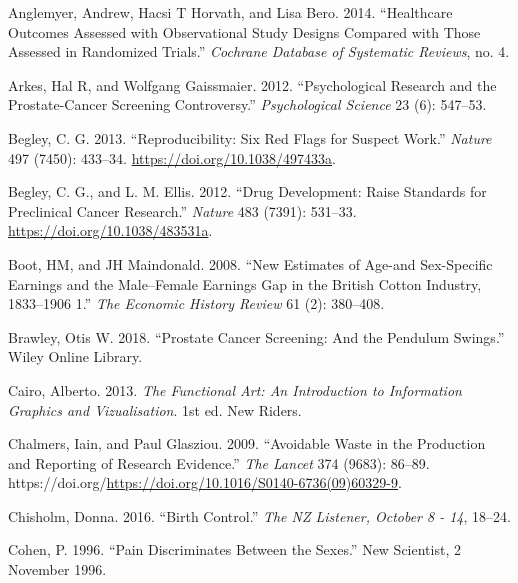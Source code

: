\documentclass[
  10pt,
  b5paper]{book}
\newlength{\cslhangindent}
\newlength{\cslentryspacingunit} %
\newenvironment{CSLReferences}[2] %
 {%
  \setlength{\parindent}{0pt}
  \ifodd #1
  \let\oldpar\par
  \def\par{\hangindent=\cslhangindent\oldpar}
  \fi
  \setlength{\parskip}{#2\cslentryspacingunit}
 }%
 {}
\begin{document}
\hypertarget{refs}{}
\begin{CSLReferences}{1}{0}
\leavevmode{}%
Anglemyer, Andrew, Hacsi T Horvath, and Lisa Bero. 2014. {``Healthcare Outcomes Assessed with Observational Study Designs Compared with Those Assessed in Randomized Trials.''} \emph{Cochrane Database of Systematic Reviews}, no. 4.

\leavevmode{}%
Arkes, Hal R, and Wolfgang Gaissmaier. 2012. {``Psychological Research and the Prostate-Cancer Screening Controversy.''} \emph{Psychological Science} 23 (6): 547--53.

\leavevmode{}%
Begley, C. G. 2013. {``Reproducibility: Six Red Flags for Suspect Work.''} \emph{Nature} 497 (7450): 433--34. \url{https://doi.org/10.1038/497433a}.

\leavevmode{}%
Begley, C. G., and L. M. Ellis. 2012. {``Drug Development: Raise Standards for Preclinical Cancer Research.''} \emph{Nature} 483 (7391): 531--33. \url{https://doi.org/10.1038/483531a}.

\leavevmode{}%
Boot, HM, and JH Maindonald. 2008. {``New Estimates of Age-and Sex-Specific Earnings and the Male--Female Earnings Gap in the British Cotton Industry, 1833--1906 1.''} \emph{The Economic History Review} 61 (2): 380--408.

\leavevmode{}%
Brawley, Otis W. 2018. {``Prostate Cancer Screening: And the Pendulum Swings.''} Wiley Online Library.

\leavevmode{}%
Cairo, Alberto. 2013. \emph{The Functional Art: An Introduction to Information Graphics and Vizualisation}. 1st ed. New Riders.

\leavevmode{}%
Chalmers, Iain, and Paul Glasziou. 2009. {``Avoidable Waste in the Production and Reporting of Research Evidence.''} \emph{The Lancet} 374 (9683): 86--89. https://doi.org/\url{https://doi.org/10.1016/S0140-6736(09)60329-9}.

\leavevmode{}%
Chisholm, Donna. 2016. {``Birth Control.''} \emph{The NZ Listener, October 8 - 14}, 18--24.

\leavevmode{}%
Cohen, P. 1996. {``Pain Discriminates Between the Sexes.''} New Scientist, 2 November 1996.


\end{CSLReferences}
\end{document}
